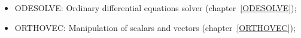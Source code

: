 \begin{itemize}
\item
{ODESOLVE: Ordinary differential equations solver}
(chapter~\ref{ODESOLVE}); 

\item
{ORTHOVEC: Manipulation of scalars and vectors}
(chapter~\ref{ORTHOVEC}); 


\end{itemize}
